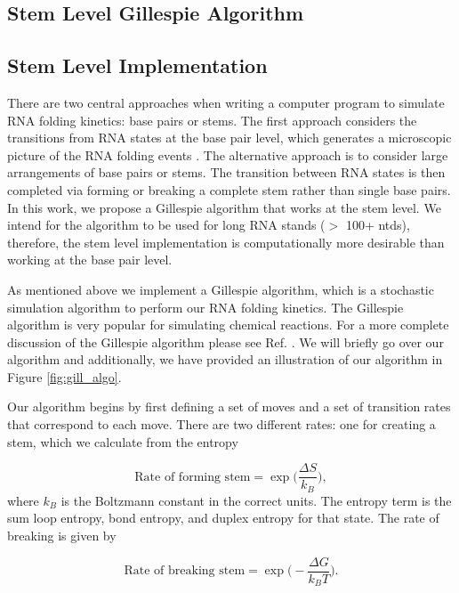 \documentclass[11pt]{article}
\begin{document}
\begin{multicols}{2}
\section{Stem Level Gillespie Algorithm}

\subsection{Stem Level Implementation}
There are two central approaches when writing a computer program to simulate RNA folding kinetics: base pairs or stems. The first approach considers the transitions from RNA states at the base pair level, which generates a microscopic picture of the RNA folding events \cite{10.1093/nar/gkv480}. The alternative approach is to consider large arrangements of base pairs or stems. The transition between RNA states is then completed via forming or breaking a complete stem rather than single base pairs. In this work, we propose a Gillespie algorithm that works at the stem level. We intend for the algorithm to be used for long RNA stands ($>$ 100+ ntds), therefore, the stem level implementation is computationally more desirable than working at the base pair level.

As mentioned above we implement a Gillespie algorithm, which is a stochastic simulation algorithm to perform our RNA folding kinetics. The Gillespie algorithm is very popular for simulating chemical reactions.  For a more complete discussion of the Gillespie algorithm please see Ref. \cite{erban2007practical}. We will briefly go over our algorithm and additionally, we have provided an illustration of our algorithm in Figure \ref{fig:gill_algo}.

Our algorithm begins by first defining a set of moves and a set of transition rates that correspond to each move. There are two different rates: one for creating a stem, which we calculate from the entropy

\begin{equation}
\text{Rate of forming stem} = \exp \Big (\frac{ \Delta S}{k_{B}} \Big ),
\end{equation}
where $k_{B}$ is the Boltzmann constant in the correct units. The entropy term is the sum loop entropy, bond entropy, and duplex entropy for that state. The rate of breaking is given by

\begin{equation}
\text{Rate of breaking stem} = \exp \Big ( - \frac{ \Delta G}{k_{B} T} \Big ).
\end{equation}


\end{multicols}
\end{document}
